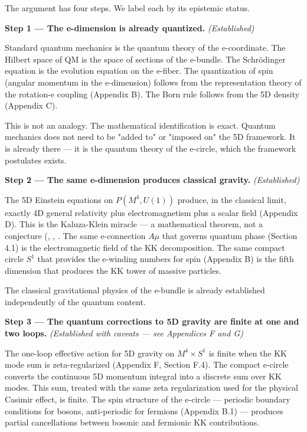 \documentclass[aps,prd,preprint,superscriptaddress,longbibliography,floatfix]{revtex4-2}
\theoremstyle{remark}
\begin{document}
The argument has four steps. We label each by its epistemic status.

\textbf{Step 1 --- The e-dimension is already quantized.} \textit{(Established)}

Standard quantum mechanics is the quantum theory of the e-coordinate. The Hilbert space of QM is the space of sections of the e-bundle. The Schr\"{o}dinger equation is the evolution equation on the e-fiber. The quantization of spin (angular momentum in the e-dimension) follows from the representation theory of the rotation-e coupling (Appendix B). The Born rule follows from the 5D density (Appendix C).

This is not an analogy. The mathematical identification is exact. Quantum mechanics does not need to be "added to" or "imposed on" the 5D framework. It is already there --- it is the quantum theory of the e-circle, which the framework postulates exists.

\textbf{Step 2 --- The same e-dimension produces classical gravity.} \textit{(Established)}

The 5D Einstein equations on $P(M^{4}, U(1))$ produce, in the classical limit, exactly 4D general relativity plus electromagnetism plus a scalar field (Appendix D). This is the Kaluza-Klein miracle --- a mathematical theorem, not a conjecture (\cite{Kaluza1921}, \cite{Klein1926}, \cite{Cho1975}. The same e-connection $A\mu$ that governs quantum phase (Section 4.1) is the electromagnetic field of the KK decomposition. The same compact circle $S^{1}$ that provides the e-winding numbers for spin (Appendix B) is the fifth dimension that produces the KK tower of massive particles.

The classical gravitational physics of the e-bundle is already established independently of the quantum content.

\textbf{Step 3 --- The quantum corrections to 5D gravity are finite at one and two loops.} \textit{(Established with caveats --- see Appendices F and G)}

The one-loop effective action for 5D gravity on $M^{4} \times S^{1}$ is finite when the KK mode sum is zeta-regularized (Appendix F, Section F.4). The compact e-circle converts the continuous 5D momentum integral into a discrete sum over KK modes. This sum, treated with the same zeta regularization used for the physical Casimir effect, is finite. The spin structure of the e-circle --- periodic boundary conditions for bosons, anti-periodic for fermions (Appendix B.1) --- produces partial cancellations between bosonic and fermionic KK contributions.
\end{document}
